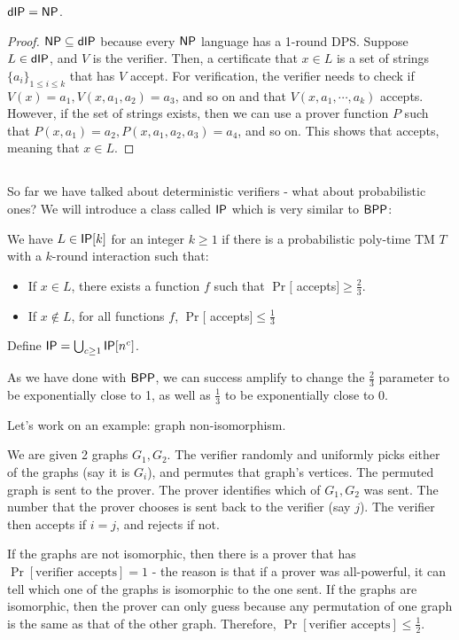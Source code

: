 \begin{theorem}
${\mathsf{dIP}} = {\mathsf{NP}}$.
\end{theorem}

\begin{proof}
${\mathsf{NP}} \subseteq {\ensuremath{\mathsf{dIP}}}$ because every ${\mathsf{NP}}$ language has a 1-round DPS. Suppose $L \in {\ensuremath{\mathsf{dIP}}}$, and $V$ is the verifier. Then, a certificate that $x \in L$ is a set of strings $\{a_i\}_{1 \le i \le k}$ that has $V$ accept. For verification, the verifier needs to check if $V(x) = a_1, V(x, a_1, a_2) = a_3$, and so on and that $V(x, a_1, \cdots, a_k)$ accepts. However, if the set of strings exists, then we can use a prover function $P$ such that $P(x, a_1) = a_2, P(x, a_1, a_2, a_3) = a_4$, and so on. This shows that  accepts, meaning that $x \in L$. 
\end{proof}

\subsection{\IP}
So far we have talked about deterministic verifiers - what about probabilistic ones? We will introduce a class called ${\mathsf{IP}}$ which is very similar to ${\mathsf{BPP}}$:

\begin{definition}
We have $L \in {\ensuremath{\mathsf{IP}}}[k]$ for an integer $k \ge 1$ if there is a probabilistic poly-time TM $T$ with a $k$-round interaction such that:
\begin{itemize}
\item If $x \in L$, there exists a function $f$ such that $\Pr[$ accepts$] \ge \frac{2}{3}$.
\item If $x \notin L$, for all functions $f$, $\Pr[$ accepts$] \le \frac{1}{3}$
\end{itemize}
Define ${\mathsf{IP}} = \bigcup_{c \ge 1}{\mathsf{IP}}[n^c]$.
\end{definition}
As we have done with ${\mathsf{BPP}}$, we can success amplify to change the $\frac{2}{3}$ parameter to be exponentially close to 1, as well as $\frac{1}{3}$ to be exponentially close to 0. 

\par Let's work on an example: graph non-isomorphism. 
\begin{example}
We are given 2 graphs $G_1, G_2$. The verifier randomly and uniformly picks either of the graphs (say it is $G_i$), and permutes that graph's vertices. The permuted graph is sent to the prover. The prover identifies which of $G_1, G_2$ was sent. The number that the prover chooses is sent back to the verifier (say $j$). The verifier then accepts if $i = j$, and rejects if not.

\par If the graphs are not isomorphic, then there is a prover that has $\Pr[\text{verifier accepts}] = 1$ - the reason is that if a prover was all-powerful, it can tell which one of the graphs is isomorphic to the one sent. If the graphs are isomorphic, then the prover can only guess because any permutation of one graph is the same as that of the other graph. Therefore, $\Pr[\text{verifier accepts}] \le \frac{1}{2}$.
\end{example}

